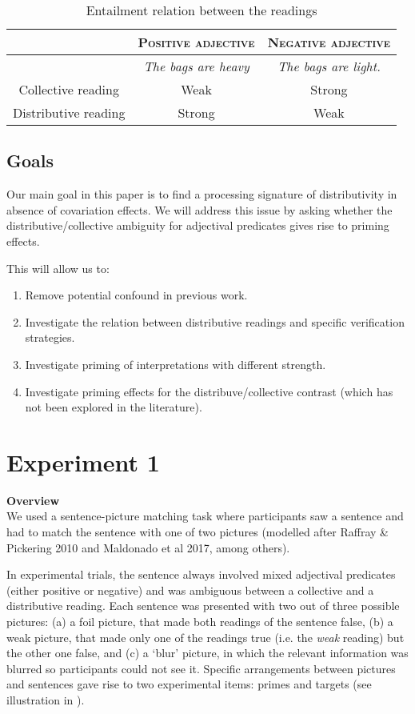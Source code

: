 \documentclass[a4paper]{article}
\begin{document}
\begin{table}[h!]
\centering
\begin{tabular}{c|c|c}
& \textsc{Positive adjective} & \textsc{Negative adjective} \\
\hline
& \textit{The bags are heavy} & \textit{The bags are light.}\\
Collective reading & Weak & Strong \\
Distributive reading & Strong & Weak\\
\end{tabular}
\caption[]{Entailment relation between the readings}
\label{table.readings.polarity}
\end{table}


\subsection{Goals}

Our main goal in this paper is to find a processing signature of distributivity in absence of covariation effects. We will address this issue by asking whether the distributive/collective ambiguity for adjectival predicates gives rise to priming effects. 

\noindent This will allow us to:
\begin{enumerate}

\item Remove potential confound in previous work.
\item Investigate the relation between distributive readings and specific verification strategies. 
\item Investigate priming of interpretations with different strength. 
\item Investigate priming effects for the distribuve/collective contrast (which has not been explored in the literature). 
\end{enumerate}


\section{Experiment 1}
\textbf{Overview}
\vspace{.4cm}\\
We used a sentence-picture matching task where participants saw a sentence and had to match the sentence with one of two pictures (modelled after Raffray \& Pickering 2010 and Maldonado et al 2017, among others). \vspace{.5cm}

\noindent In experimental trials, the sentence always involved mixed adjectival predicates (either positive or negative) and was ambiguous between a collective and a distributive reading. Each sentence was presented with two out of three possible pictures: (a) a foil picture, that made both readings of the sentence false, (b) a weak picture, that made only one of the readings true (i.e. the \emph{weak} reading) but the other one false, and (c) a `blur' picture, in which the relevant information was blurred so participants could not see it.  
Specific arrangements between pictures and sentences gave rise to two experimental items: primes and targets (see illustration in ). 
\end{document}
